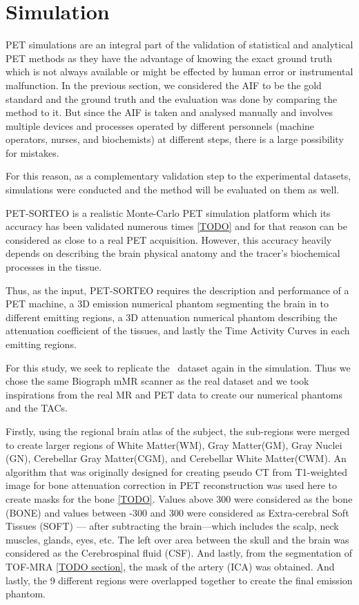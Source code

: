 \section{Simulation}
PET simulations are an integral part of the validation of statistical and analytical PET methods as they have the advantage of knowing the exact ground truth which is not always available or might be effected by human error or instrumental malfunction.
In the previous section, we considered the AIF to be the gold standard and the ground truth and the evaluation was done by comparing the method to it.
But since the AIF is taken and analysed manually and involves multiple devices and processes operated by different personnels (machine operators, nurses, and biochemists) at different steps, there is a large possibility for mistakes.

For this reason, as a complementary validation step to the experimental datasets, simulations were conducted and the method will be evaluated on them as well.

PET-SORTEO is a realistic Monte-Carlo PET simulation platform which its accuracy has been validated numerous times \ref{TODO} and for that reason can be considered as close to a real PET acquisition.
However, this accuracy heavily depends on describing the brain physical anatomy and the tracer's biochemical processes in the tissue.

Thus, as the input, PET-SORTEO requires the description and performance of a PET machine, a 3D emission numerical phantom segmenting the brain in to different emitting regions, a 3D attenuation numerical phantom describing the attenuation coefficient of the tissues, and lastly the Time Activity Curves in each emitting regions.

For this study, we seek to replicate the \fdg$\,$ dataset again in the simulation.
Thus we chose the same Biograph mMR scanner as the real dataset and we took inspirations from the real MR and PET data to create our numerical phantoms and the TACs.

Firstly, using the regional brain atlas of the subject, the sub-regions were merged to create larger regions of White Matter(WM), Gray Matter(GM), Gray Nuclei (GN), Cerebellar Gray Matter(CGM), and Cerebellar White Matter(CWM).
An algorithm that was originally designed for creating pseudo CT from T1-weighted image for bone attenuation correction in PET reconstruction was used here to create masks for the bone \ref{TODO}.
Values above 300 were considered as the bone (BONE) and values between -300 and 300 were considered as Extra-cerebral Soft Tissues (SOFT) --- after subtracting the brain---which includes the scalp, neck muscles, glands, eyes, etc.
The left over area between the skull and the brain was considered as the Cerebrospinal fluid (CSF).
And lastly, from the segmentation of TOF-MRA \ref{TODO section}, the mask of the artery (ICA) was obtained.
And lastly, the 9 different regions were overlapped together to create the final emission phantom.


